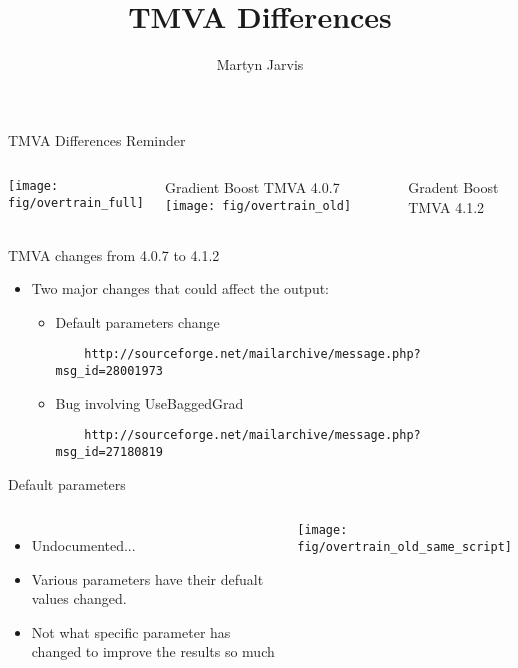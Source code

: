 \documentclass[t, 8pt]{beamer}
\author{Martyn Jarvis}
\title[TMVA Differnces]{TMVA Differences}
\begin{document}


\begin{frame}{TMVA Differences Reminder}
  \begin{columns}[c]
    \texttt{[image: fig/overtrain\_full]}
    
    Gradient Boost TMVA 4.0.7
    \texttt{[image: fig/overtrain\_old]}
    
    Gradent Boost TMVA 4.1.2
  \end{columns}
\end{frame}

\begin{frame}[fragile]{TMVA changes from 4.0.7 to 4.1.2}
  \begin{itemize}  
  \item Two major changes that could affect the output:
  \begin{itemize}  
    \item Default parameters change
    \begin{verbatim}
    http://sourceforge.net/mailarchive/message.php?msg_id=28001973
    \end{verbatim}
    \item Bug involving UseBaggedGrad
    \begin{verbatim}
    http://sourceforge.net/mailarchive/message.php?msg_id=27180819
    \end{verbatim}
  \end{itemize}
  \end{itemize}
\end{frame}

\begin{frame}{Default parameters}
  \begin{columns}[c]
  \begin{itemize}
    \item Undocumented...
    \item Various parameters have their defualt values changed.
    \item Not what specific parameter has changed to improve the results so much
  \end{itemize}
    \texttt{[image: fig/overtrain\_old\_same\_script]}
  \end{columns}
\end{frame}
\end{document}
